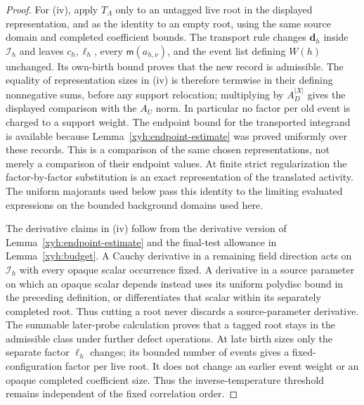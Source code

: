 \begin{proof}
For (iv), apply $T_\Lambda$ only to an untagged live root in the displayed
representation, and as the identity to an empty root, using the same
source domain and completed coefficient bounds. The transport rule changes
$\mathbf d_h$ inside $\mathcal I_h$ and leaves $c_h,\ell_h$, every $\mathsf m(a_{h,\nu})$,
and the event list defining $W(h)$ unchanged. Its own-birth bound proves
that the new record is admissible. The equality of representation sizes
in (iv) is therefore termwise in their defining nonnegative sums, before
any support relocation; multiplying by $A_D^{|X|}$ gives the displayed
comparison with the $A_U$ norm. In particular no factor per old event is
charged to a support weight. The endpoint bound for the transported
integrand is available because Lemma~\ref{xyh:endpoint-estimate} was
proved uniformly over these records. This is a comparison of the same
chosen representations, not merely a comparison of their endpoint values.
At finite strict regularization the factor-by-factor substitution is an
exact representation of the translated activity. The uniform majorants
used below pass this identity to the limiting evaluated expressions on
the bounded background domains used here.

The derivative claims in (iv) follow from the derivative version of
Lemma~\ref{xyh:endpoint-estimate} and the final-test allowance in
Lemma~\ref{xyh:budget}. A Cauchy derivative in a remaining field
direction acts on $\mathcal I_h$ with every opaque scalar occurrence
fixed. A derivative in a source parameter on which an opaque scalar
depends instead uses its uniform polydisc bound in the preceding
definition, or differentiates that scalar within its separately completed
root. Thus cutting a root never discards a source-parameter derivative.
The summable later-probe calculation proves that
a tagged root stays in the admissible class under further defect
operations. At late birth sizes only the separate factor $\ell_h$ changes;
its bounded number of events gives a fixed-configuration factor per live
root. It does not change an earlier event weight or an opaque completed
coefficient size. Thus the inverse-temperature threshold remains
independent of the fixed correlation order.


\end{proof}
